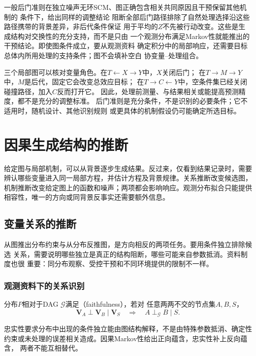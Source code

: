一般后门准则在独立噪声无环SCM、图正确包含相关共同原因且干预保留其他机制的
条件下，给出同样的调整结论
阻断全部后门路径排除了自然处理选择沿这些路径携带的背景差异，非后代条件保证
用于平均的\(Z\)不先被行动改变。这些是生成结构对交换性的充分支持，而不是只由
一个观测分布满足Markov性就能推出的干预结论。即使图条件成立，要从观测资料
确定积分中的局部响应，还需要目标总体内所用处理的支持条件；图不会填补空白
协变量--处理组合。

三个局部图可以核对变量角色。在\(T\leftarrow X\to Y\)中，\(X\)关闭后门；
在\(T\to M\to Y\)中，\(M\)是后代，固定它会改变总效应目标；
在\(T\to C\leftarrow Y\)中，空条件集已经关闭碰撞路径，加入\(C\)反而打开它。
因此，处理前测量、与结果相关或能提高预测精度，都不是充分的调整标准。
后门准则是充分条件，不是识别的必要条件；它不适用时，随机设计、其他识别规则
或更具体的机制假设仍可能确定所选目标。

\section{因果生成结构的推断}
\label{sec:causal-structure-discovery}

给定图与局部机制，可以从背景逐步生成结果。反过来，仅看到结果记录时，需要辨认哪些变量进入同一局部方程，并估计方程及背景规律。关系推断改变候选图，机制推断改变给定图上的函数和噪声；两项都会影响响应。观测分布拟合只能提供相容性，唯一的方向或同背景反事实还需要额外信息。

\subsection{变量关系的推断}
\label{sec:causal-relation-inference}

从图推出分布约束与从分布反推图，是方向相反的两项任务。要用条件独立排除候选
关系，需要说明哪些独立是真正的结构阻断，哪些可能来自参数抵消。资料制度也很
重要：同分布观察、受控干预和不同环境提供的限制不一样。

\subsubsection{观测资料下的关系识别}
\label{sec:causal-observational-structure}

\begin{definition}[相对于DAG的忠实性]
  \label{def:causal-faithfulness}
  分布\(P\)相对于DAG \(\mathcal G\)满足（faithfulness），若对
  任意两两不交的节点集\(A,B,S\)，
  \[
    \bm V_A\perp\bm V_B\mid\bm V_S
    \quad\Longrightarrow\quad
    A\perp_{\mathcal G}B\mid S.
  \]
\end{definition}
忠实性要求分布中出现的条件独立能由图结构解释，不是由特殊参数抵消、确定性
约束或未处理的误差相关造成。因果Markov性给出正向蕴含，忠实性补上反向蕴含，
两者不能互相替代。

